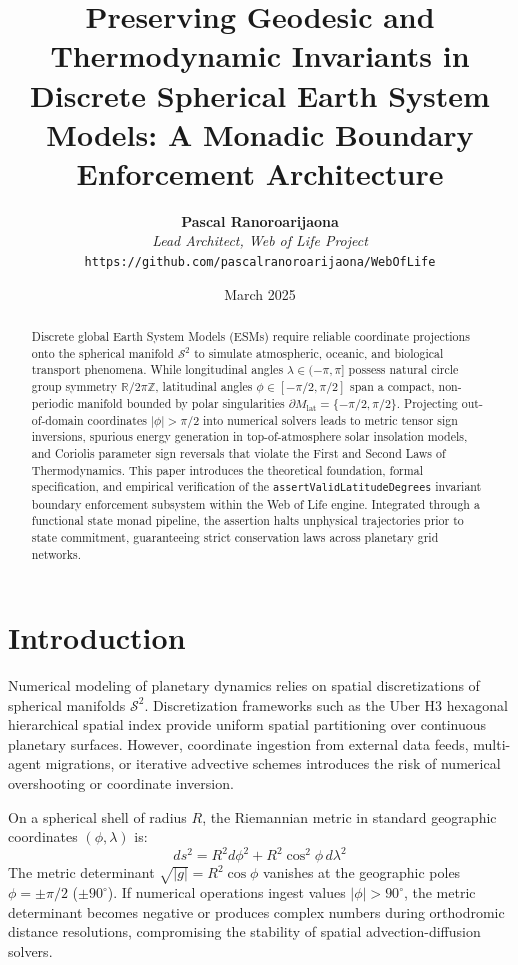 \documentclass[11pt,a4paper]{article}
\title{\textbf{Preserving Geodesic and Thermodynamic Invariants in Discrete Spherical Earth System Models: A Monadic Boundary Enforcement Architecture}}
\author{
  \textbf{Pascal Ranoroarijaona} \\
  \textit{Lead Architect, Web of Life Project} \\
  \texttt{https://github.com/pascalranoroarijaona/WebOfLife}
}
\date{March 2025}
\begin{document}
\maketitle

\begin{abstract}
Discrete global Earth System Models (ESMs) require reliable coordinate projections onto the spherical manifold $\mathcal{S}^2$ to simulate atmospheric, oceanic, and biological transport phenomena. While longitudinal angles $\lambda \in (-\pi, \pi]$ possess natural circle group symmetry $\mathbb{R} / 2\pi\mathbb{Z}$, latitudinal angles $\phi \in [-\pi/2, \pi/2]$ span a compact, non-periodic manifold bounded by polar singularities $\partial M_{\text{lat}} = \{-\pi/2, \pi/2\}$. Projecting out-of-domain coordinates $|\phi| > \pi/2$ into numerical solvers leads to metric tensor sign inversions, spurious energy generation in top-of-atmosphere solar insolation models, and Coriolis parameter sign reversals that violate the First and Second Laws of Thermodynamics. This paper introduces the theoretical foundation, formal specification, and empirical verification of the \texttt{assertValidLatitudeDegrees} invariant boundary enforcement subsystem within the Web of Life engine. Integrated through a functional state monad pipeline, the assertion halts unphysical trajectories prior to state commitment, guaranteeing strict conservation laws across planetary grid networks.
\end{abstract}

\section{Introduction}

Numerical modeling of planetary dynamics relies on spatial discretizations of spherical manifolds $\mathcal{S}^2$. Discretization frameworks such as the Uber H3 hexagonal hierarchical spatial index provide uniform spatial partitioning over continuous planetary surfaces. However, coordinate ingestion from external data feeds, multi-agent migrations, or iterative advective schemes introduces the risk of numerical overshooting or coordinate inversion.

On a spherical shell of radius $R$, the Riemannian metric in standard geographic coordinates $(\phi, \lambda)$ is:
\begin{equation}
ds^2 = R^2 d\phi^2 + R^2 \cos^2\phi \, d\lambda^2
\end{equation}
The metric determinant $\sqrt{|g|} = R^2 \cos\phi$ vanishes at the geographic poles $\phi = \pm \pi/2$ ($\pm 90^\circ$). If numerical operations ingest values $|\phi| > 90^\circ$, the metric determinant becomes negative or produces complex numbers during orthodromic distance resolutions, compromising the stability of spatial advection-diffusion solvers.
\end{document}
